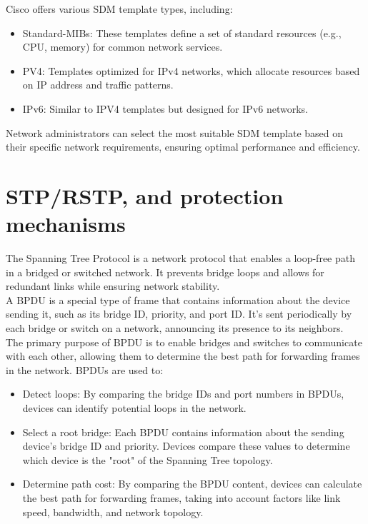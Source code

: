 \documentclass[parindent=0pt]{article}
\begin{document}
Cisco offers various SDM template types, including:
	\begin{itemize}
		\item  Standard-MIBs: These templates define a set of standard resources (e.g., CPU, memory) for common network services.
		\item PV4: Templates optimized for IPv4 networks, which allocate resources based on IP address and traffic patterns. 
		\item IPv6: Similar to IPV4 templates but designed for IPv6 networks. 
	\end{itemize}

Network administrators can select the most suitable SDM template based on their specific network requirements, ensuring optimal performance and efficiency.\\

\section*{STP/RSTP, and protection mechanisms}
The Spanning Tree Protocol is a network protocol that enables a loop-free path in a bridged or switched network. It prevents bridge loops and allows for redundant links while ensuring network stability.\\

A BPDU is a special type of frame that contains information about the device sending it, such as its bridge ID, priority, and port ID. It's sent periodically by each bridge or switch on a network, announcing its presence to its neighbors.\\

The primary purpose of BPDU is to enable bridges and switches to communicate with each other, allowing them to determine the best path for forwarding frames in the network. BPDUs are used to:
	\begin{itemize}
		\item Detect loops: By comparing the bridge IDs and port numbers in BPDUs, devices can identify potential loops in the network.
		\item Select a root bridge: Each BPDU contains information about the sending device's bridge ID and priority. Devices compare these values to determine which device is the "root" of the Spanning Tree topology.
		\item Determine path cost: By comparing the BPDU content, devices can calculate the best path for forwarding frames, taking into account factors like link speed, bandwidth, and network topology.
	\end{itemize}
\end{document}
